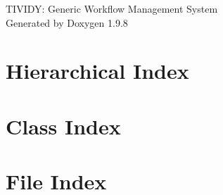 \documentclass[twoside]{book}
\newcommand{\+}{\discretionary{\mbox{\scriptsize$\hookleftarrow$}}{}{}}
\newcommand{\clearemptydoublepage}{%
    \newpage{\pagestyle{empty}\cleardoublepage}%
  }
\begin{document}
  \raggedbottom
    \hypersetup{pageanchor=false,
                bookmarksnumbered=true,
                pdfencoding=unicode
               }
  \begin{titlepage}
  \vspace*{7cm}
  \begin{center}%
  {\Large TIVIDY\+: Generic Workflow Management System}\\
  \vspace*{1cm}
  {\large Generated by Doxygen 1.9.8}\\
  \end{center}
  \end{titlepage}
  \clearemptydoublepage
  \tableofcontents
  \clearemptydoublepage
  \hypersetup{pageanchor=true}
\chapter{Hierarchical Index}

\chapter{Class Index}

\chapter{File Index}

\end{document}
